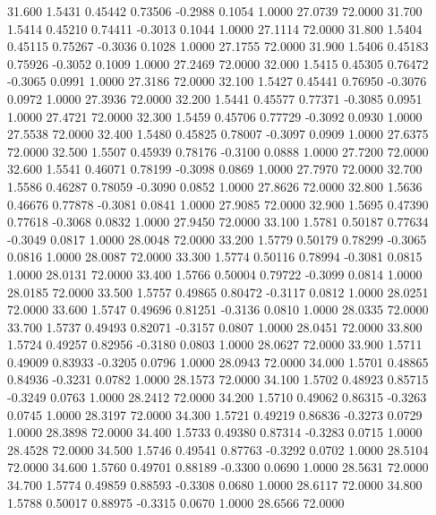   31.600   1.5431   0.45442   0.73506  -0.2988   0.1054   1.0000  27.0739  72.0000
  31.700   1.5414   0.45210   0.74411  -0.3013   0.1044   1.0000  27.1114  72.0000
  31.800   1.5404   0.45115   0.75267  -0.3036   0.1028   1.0000  27.1755  72.0000
  31.900   1.5406   0.45183   0.75926  -0.3052   0.1009   1.0000  27.2469  72.0000
  32.000   1.5415   0.45305   0.76472  -0.3065   0.0991   1.0000  27.3186  72.0000
  32.100   1.5427   0.45441   0.76950  -0.3076   0.0972   1.0000  27.3936  72.0000
  32.200   1.5441   0.45577   0.77371  -0.3085   0.0951   1.0000  27.4721  72.0000
  32.300   1.5459   0.45706   0.77729  -0.3092   0.0930   1.0000  27.5538  72.0000
  32.400   1.5480   0.45825   0.78007  -0.3097   0.0909   1.0000  27.6375  72.0000
  32.500   1.5507   0.45939   0.78176  -0.3100   0.0888   1.0000  27.7200  72.0000
  32.600   1.5541   0.46071   0.78199  -0.3098   0.0869   1.0000  27.7970  72.0000
  32.700   1.5586   0.46287   0.78059  -0.3090   0.0852   1.0000  27.8626  72.0000
  32.800   1.5636   0.46676   0.77878  -0.3081   0.0841   1.0000  27.9085  72.0000
  32.900   1.5695   0.47390   0.77618  -0.3068   0.0832   1.0000  27.9450  72.0000
  33.100   1.5781   0.50187   0.77634  -0.3049   0.0817   1.0000  28.0048  72.0000
  33.200   1.5779   0.50179   0.78299  -0.3065   0.0816   1.0000  28.0087  72.0000
  33.300   1.5774   0.50116   0.78994  -0.3081   0.0815   1.0000  28.0131  72.0000
  33.400   1.5766   0.50004   0.79722  -0.3099   0.0814   1.0000  28.0185  72.0000
  33.500   1.5757   0.49865   0.80472  -0.3117   0.0812   1.0000  28.0251  72.0000
  33.600   1.5747   0.49696   0.81251  -0.3136   0.0810   1.0000  28.0335  72.0000
  33.700   1.5737   0.49493   0.82071  -0.3157   0.0807   1.0000  28.0451  72.0000
  33.800   1.5724   0.49257   0.82956  -0.3180   0.0803   1.0000  28.0627  72.0000
  33.900   1.5711   0.49009   0.83933  -0.3205   0.0796   1.0000  28.0943  72.0000
  34.000   1.5701   0.48865   0.84936  -0.3231   0.0782   1.0000  28.1573  72.0000
  34.100   1.5702   0.48923   0.85715  -0.3249   0.0763   1.0000  28.2412  72.0000
  34.200   1.5710   0.49062   0.86315  -0.3263   0.0745   1.0000  28.3197  72.0000
  34.300   1.5721   0.49219   0.86836  -0.3273   0.0729   1.0000  28.3898  72.0000
  34.400   1.5733   0.49380   0.87314  -0.3283   0.0715   1.0000  28.4528  72.0000
  34.500   1.5746   0.49541   0.87763  -0.3292   0.0702   1.0000  28.5104  72.0000
  34.600   1.5760   0.49701   0.88189  -0.3300   0.0690   1.0000  28.5631  72.0000
  34.700   1.5774   0.49859   0.88593  -0.3308   0.0680   1.0000  28.6117  72.0000
  34.800   1.5788   0.50017   0.88975  -0.3315   0.0670   1.0000  28.6566  72.0000
